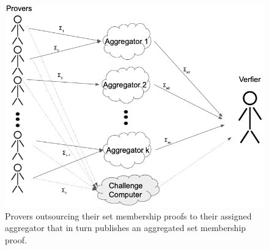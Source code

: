  \begin{figure}
\includegraphics[width=\linewidth]{./figure/splitagg.png}
\caption{Provers outsourcing their set membership proofs to their assigned aggregator that in turn publishes an aggregated set membership proof. }
\label{fig:workflow}
\end{figure} 





